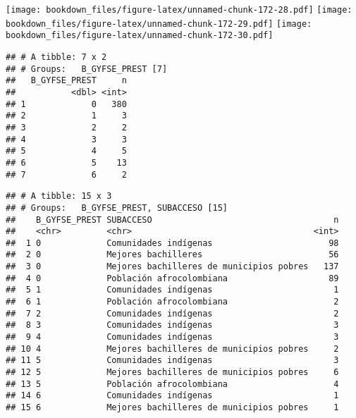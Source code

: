 \documentclass[]{article}
\theoremstyle{definition}
\theoremstyle{definition}
\theoremstyle{definition}
\theoremstyle{remark}
\begin{document}
\texttt{[image: bookdown\_files/figure-latex/unnamed-chunk-172-28.pdf]}
\texttt{[image: bookdown\_files/figure-latex/unnamed-chunk-172-29.pdf]}
\texttt{[image: bookdown\_files/figure-latex/unnamed-chunk-172-30.pdf]}

\begin{verbatim}
## # A tibble: 7 x 2
## # Groups:   B_GYFSE_PREST [7]
##   B_GYFSE_PREST     n
##           <dbl> <int>
## 1             0   380
## 2             1     3
## 3             2     2
## 4             3     3
## 5             4     5
## 6             5    13
## 7             6     2
\end{verbatim}

\begin{verbatim}
## # A tibble: 15 x 3
## # Groups:   B_GYFSE_PREST, SUBACCESO [15]
##    B_GYFSE_PREST SUBACCESO                                    n
##    <chr>         <chr>                                    <int>
##  1 0             Comunidades indígenas                       98
##  2 0             Mejores bachilleres                         56
##  3 0             Mejores bachilleres de municipios pobres   137
##  4 0             Población afrocolombiana                    89
##  5 1             Comunidades indígenas                        1
##  6 1             Población afrocolombiana                     2
##  7 2             Comunidades indígenas                        2
##  8 3             Comunidades indígenas                        3
##  9 4             Comunidades indígenas                        3
## 10 4             Mejores bachilleres de municipios pobres     2
## 11 5             Comunidades indígenas                        3
## 12 5             Mejores bachilleres de municipios pobres     6
## 13 5             Población afrocolombiana                     4
## 14 6             Comunidades indígenas                        1
## 15 6             Mejores bachilleres de municipios pobres     1
\end{verbatim}
\end{document}
